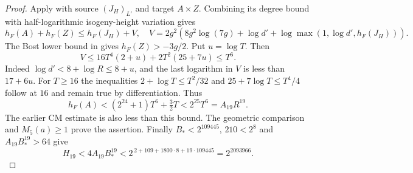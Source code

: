 \begin{proof}
Apply \cite[Theorem~1.9(1), pp.~7--8]{GaudronRemond2023} with source
$(J_H)_{L'}$ and target $A\times Z$. Combining its degree bound with
half-logarithmic isogeny-height variation gives
\[
 h_F(A)+h_F(Z)\le h_F(J_H)+V,\quad
 V=2g^2\left(8g^2\log(7g)+\log d'
     +\log\max(1,\log d',h_F(J_H))\right).
\]
The Bost lower bound in \cite[(2.2), p.~5]{vonKaenel2021} gives
$h_F(Z)>-3g/2$. Put $u=\log T$. Then
\[
 V\le16T^4(2+u)+2T^2(25+7u)\le T^6.
\]
Indeed $\log d'<8+\log R\le8+u$, and the last logarithm in $V$ is
less than $17+6u$. For $T\ge16$ the inequalities
$2+\log T\le T^2/32$ and $25+7\log T\le T^4/4$ follow at $16$
and remain true by differentiation. Thus
\[
 h_F(A)<(2^{24}+1)T^6+\tfrac32T
       <2^{25}T^6=A_{19}R^{19}.
\]
The earlier CM estimate is also less than this bound.
The geometric comparison and $M_5(a)\ge1$ prove the assertion.
Finally $B_*<2^{109445}$, $210<2^8$ and $A_{19}B_*^{19}>64$ give
\[
 H_{19}<4A_{19}B_*^{19}
       <2^{\,2+109+1800\cdot8+19\cdot109445}
       =2^{2093966}.
\]
\end{proof}

